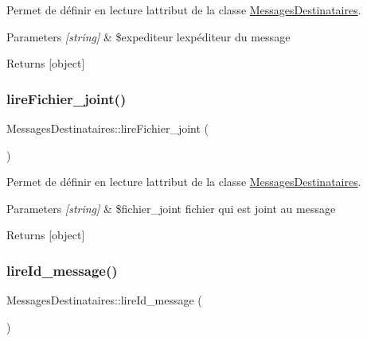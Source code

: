 Permet de définir en lecture l\textquotesingle{}attribut de la classe \hyperlink{class_messages_destinataires}{Messages\+Destinataires}. 


\begin{DoxyParams}{Parameters}
{\em \mbox{[}string\mbox{]}} & \$expediteur l\textquotesingle{}expéditeur du message \\
\hline
\end{DoxyParams}
\begin{DoxyReturn}{Returns}
\mbox{[}object\mbox{]} 
\end{DoxyReturn}
\mbox{\label{class_messages_destinataires_ae0fed10b7898e856eefdeb2748a8182b}} 
\subsubsection{\texorpdfstring{lire\+Fichier\+\_\+joint()}{lireFichier\_joint()}}
{\footnotesize\ttfamily Messages\+Destinataires\+::lire\+Fichier\+\_\+joint (\begin{DoxyParamCaption}{ }\end{DoxyParamCaption})}



Permet de définir en lecture l\textquotesingle{}attribut de la classe \hyperlink{class_messages_destinataires}{Messages\+Destinataires}. 


\begin{DoxyParams}{Parameters}
{\em \mbox{[}string\mbox{]}} & \$fichier\+\_\+joint fichier qui est joint au message \\
\hline
\end{DoxyParams}
\begin{DoxyReturn}{Returns}
\mbox{[}object\mbox{]} 
\end{DoxyReturn}
\mbox{\label{class_messages_destinataires_a87b80bdd09ff512ccdb198491c61198d}} 
\subsubsection{\texorpdfstring{lire\+Id\+\_\+message()}{lireId\_message()}}
{\footnotesize\ttfamily Messages\+Destinataires\+::lire\+Id\+\_\+message (\begin{DoxyParamCaption}{ }\end{DoxyParamCaption})}



